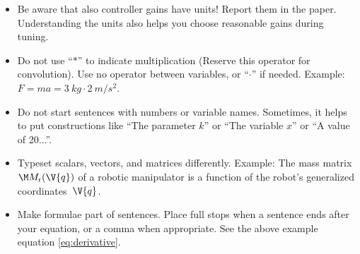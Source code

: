 \begin{itemize}
\item Be aware that also controller gains have units! Report them in the paper. Understanding the units also helps you choose reasonable gains during tuning.

\item Do not use ``$\ast$'' to indicate multiplication (Reserve this operator for convolution). Use no operator between variables, or ``$\cdot$'' if needed. Example: $F=ma=\SI{3}{kg}\cdot\SI{2}{m/s^2}$.

\item Do not start sentences with numbers or variable names. Sometimes, it helps to put constructions like ``The parameter $k$'' or ``The variable $x$'' or ``A value of 20...''.

\item Typeset scalars, vectors, and matrices differently. Example:
The mass matrix $\M M_{\mathrm{r}}(\V{q})$ of a robotic manipulator is a function of the robot's generalized coordinates~$\V{q}$.

\item Make formulae part of sentences. Place full stops when a sentence ends after your equation, or a comma when appropriate. See the above example equation \eqref{eq:derivative}. %

\end{itemize}


